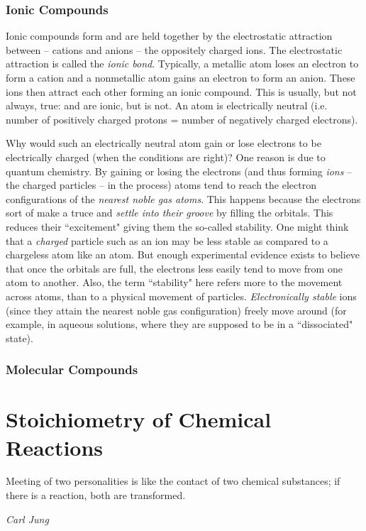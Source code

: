 \documentclass{article}
\begin{document}
\subsubsection{Ionic Compounds}
Ionic compounds form and are held together by the electrostatic attraction between -- cations and anions -- the oppositely charged ions. The electrostatic attraction is called the \emph{ionic bond}. Typically, a metallic atom loses an electron to form a cation and a nonmetallic atom gains an electron to form an anion. These ions then attract each other forming an ionic compound. This is usually, but not always, true:  and  are ionic, but  is not. An atom is electrically neutral (i.e. number of positively charged protons = number of negatively charged electrons). 

Why would such an electrically neutral atom gain or lose electrons to be electrically charged (when the conditions are right)? One reason is due to quantum chemistry. By gaining or losing the electrons (and thus forming \emph{ions} -- the charged particles -- in the process) atoms tend to reach the electron configurations of the \emph{nearest noble gas atoms}. This happens because the electrons sort of make a truce and \emph{settle into their groove} by filling the orbitals. This reduces their ``excitement" giving them the so-called stability. One might think that a \emph{charged} particle such as an  ion may be less stable as compared to a chargeless atom like an  atom. But enough experimental evidence exists to believe that once the orbitals are full, the electrons less easily tend to move from one atom to another. Also, the term ``stability" here refers more to the movement across atoms, than to a physical movement of particles. \emph{Electronically stable} ions (since they attain the nearest noble gas configuration) freely move around (for example, in aqueous solutions, where they are supposed to be in a ``dissociated" state). 
\subsubsection{Molecular Compounds}
\section{Stoichiometry of Chemical Reactions}
\renewcommand{\epigraphsize}{\small}
\setlength{\epigraphwidth}{0.8\textwidth}
\epigraph
{
    Meeting of two personalities is like the contact of two chemical substances; if there is a reaction, both are transformed.
}
{
    \textit{Carl Jung}
}
\end{document}

